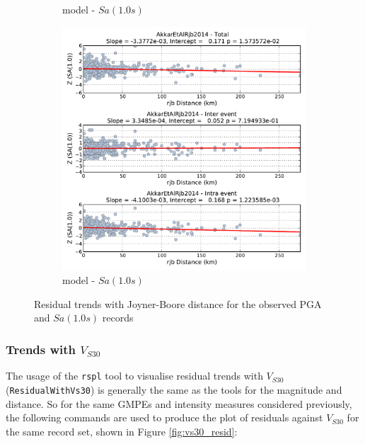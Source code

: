 \begin{figure}[htb]
\begin{subfigure}[b]{0.49\textwidth}
      \caption{\cite{boore2008} model - $Sa \left( {1.0 s} \right)$}
      \label{fig:sa1_dist_ba2008}
  \end{subfigure}
      \begin{subfigure}[b]{0.49\textwidth}
      \includegraphics[width=\textwidth]{./figures/residuals/Akkar2014_Distance_Sa1.pdf}
     \caption{\cite{Akkar_etal2014} model - $Sa \left( {1.0 s} \right)$}
      \label{fig:sa1_dist_akkar2014}
  \end{subfigure}
  \caption{Residual trends with Joyner-Boore distance for the observed PGA and $Sa \left( {1.0 s} \right)$ records}
  \label{fig:dist_resid}
\end{figure}

\subsubsection{Trends with $V_{S30}$}

The usage of the \verb=rspl= tool to visualise residual trends with $V_{S30}$ (\verb=ResidualWithVs30=) is generally the same as the tools for the magnitude and distance. So for the same GMPEs and intensity measures considered previously, the following commands are used to produce the plot of residuals against $V_{S30}$ for the same record set, shown in Figure \ref{fig:vs30_resid}:
 
